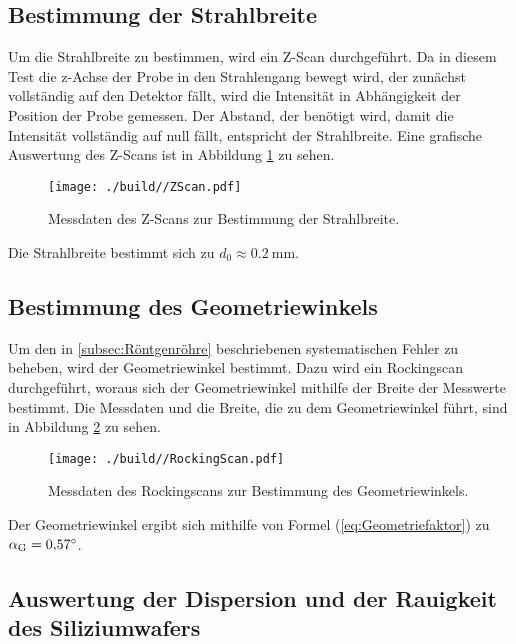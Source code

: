 \subsection{Bestimmung der Strahlbreite}
\label{subsec:Strahlbreite}

Um die Strahlbreite zu bestimmen, wird ein Z-Scan durchgeführt.
Da in diesem Test die z-Achse der Probe in den Strahlengang bewegt wird, der zunächst vollständig auf den Detektor fällt, wird die Intensität in Abhängigkeit der Position der Probe gemessen.
Der Abstand, der benötigt wird, damit die Intensität vollständig auf null fällt, entspricht der Strahlbreite.
Eine grafische Auswertung des Z-Scans ist in Abbildung \ref{fig:ZScan} zu sehen.
\begin{figure}[H]
    \centering
    \texttt{[image: ./build//ZScan.pdf]}
    \caption{Messdaten des Z-Scans zur Bestimmung der Strahlbreite.}
    \label{fig:ZScan}
\end{figure}
\noindent
Die Strahlbreite bestimmt sich zu $d_0\approx\SI{0.2}{\milli\meter}$.

\subsection{Bestimmung des Geometriewinkels}
\label{subsec:Geometriewinkel}

Um den in \autoref{subsec:Röntgenröhre} beschriebenen systematischen Fehler zu beheben, wird der Geometriewinkel bestimmt.
Dazu wird ein Rockingscan durchgeführt, woraus sich der Geometriewinkel mithilfe der Breite der Messwerte bestimmt.
Die Messdaten und die Breite, die zu dem Geometriewinkel führt, sind in Abbildung \ref{fig:RockingScan} zu sehen.
\begin{figure}[H]
    \centering
    \texttt{[image: ./build//RockingScan.pdf]}
    \caption{Messdaten des Rockingscans zur Bestimmung des Geometriewinkels.}
    \label{fig:RockingScan}
\end{figure}
\noindent
Der Geometriewinkel ergibt sich mithilfe von Formel (\ref{eq:Geometriefaktor}) zu $\alpha_{\text G} = \SI{0.57}{\degree}$.

\subsection{Auswertung der Dispersion und der Rauigkeit des Siliziumwafers}
\label{subsec:Dispersion}

